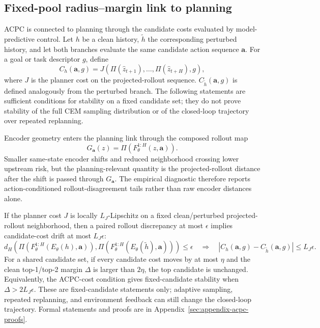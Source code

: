 \documentclass[10pt]{article}
\begin{document}
\subsection{Fixed-pool radius--margin link to planning}\label{sec:acpc-planner-stability}

ACPC is connected to planning through the candidate costs evaluated by model-predictive control. Let $h$ be a clean history, $\tilde h$ the corresponding perturbed history, and let both branches evaluate the same candidate action sequence $\mathbf a$. For a goal or task descriptor $g$, define
\begin{equation}
  C_h(\mathbf a, g)
  = J\!\left(\Pi(\hat z_{t+1}), \ldots, \Pi(\hat z_{t+H}), g\right),
  \label{eq:candidate-cost}
\end{equation}
where $J$ is the planner cost on the projected-rollout sequence. $C_{\tilde h}(\mathbf a,g)$ is defined analogously from the perturbed branch. The following statements are sufficient conditions for stability on a fixed candidate set; they do not prove stability of the full CEM sampling distribution or of the closed-loop trajectory over repeated replanning.

Encoder geometry enters the planning link through the composed rollout map
\[
  G_{\mathbf a}(z)=\Pi(F_\theta^{1:H}(z,\mathbf a)).
\]
Smaller same-state encoder shifts and reduced neighborhood crossing lower upstream risk, but the planning-relevant quantity is the projected-rollout distance after the shift is passed through $G_{\mathbf a}$. The empirical diagnostic therefore reports action-conditioned rollout-disagreement tails rather than raw encoder distances alone.

If the planner cost $J$ is locally $L_J$-Lipschitz on a fixed clean/perturbed projected-rollout neighborhood, then a paired rollout discrepancy at most $\epsilon$ implies candidate-cost drift at most $L_J\epsilon$:
\[
 d_H\!\left(\Pi(F_\theta^{1:H}(E_\theta(h),\mathbf a)),
             \Pi(F_\theta^{1:H}(E_\theta(\tilde h),\mathbf a))\right) \le \epsilon
 \quad\Rightarrow\quad
 |C_h(\mathbf a,g)-C_{\tilde h}(\mathbf a,g)| \le L_J\epsilon .
\]
For a shared candidate set, if every candidate cost moves by at most $\eta$ and the clean top-1/top-2 margin $\Delta$ is larger than $2\eta$, the top candidate is unchanged. Equivalently, the ACPC-cost condition gives fixed-candidate stability when $\Delta>2L_J\epsilon$. These are fixed-candidate statements only; adaptive sampling, repeated replanning, and environment feedback can still change the closed-loop trajectory. Formal statements and proofs are in Appendix~\ref{sec:appendix-acpc-proofs}.
\end{document}
